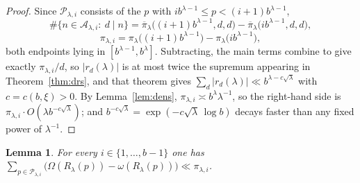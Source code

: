 \documentclass[11pt,a4paper]{article}
\theoremstyle{plain}
\newtheorem{lemma}[theorem]{Lemma}
\theoremstyle{definition}
\numberwithin{equation}{section}
\begin{document}
\begin{proof}
Since $\mathcal P_{\lambda,i}$
consists of the $p$ with $ib^{\lambda-1}\le p<(i+1)b^{\lambda-1}$,
\[
\#\bigl\{n\in\mathcal A_{\lambda,i}:\ d\mid n\bigr\}
=\overline\pi_\lambda\bigl((i+1)b^{\lambda-1},d,d\bigr)-\overline\pi_\lambda\bigl(ib^{\lambda-1},d,d\bigr),
\]
\[ \pi_{\lambda,i}=\pi_\lambda\bigl((i+1)b^{\lambda-1}\bigr)-\pi_\lambda\bigl(ib^{\lambda-1}\bigr),
\]
both endpoints lying in $[b^{\lambda-1},b^{\lambda}]$. Subtracting, the main terms combine to give exactly
$\pi_{\lambda,i}/d$, so $|r_d(\lambda)|$ is at most twice the supremum appearing in
Theorem~\ref{thm:drs}, and that theorem gives $\sum_{d}|r_d(\lambda)|\ll b^{\lambda-c\sqrt\lambda}$ with
$c=c(b,\xi)>0$. By Lemma~\ref{lem:dens}, $\pi_{\lambda,i}\asymp b^{\lambda}\lambda^{-1}$, so the
right-hand side is $\pi_{\lambda,i}\cdot O(\lambda b^{-c\sqrt\lambda})$; and
$b^{-c\sqrt\lambda}=\exp(-c\sqrt\lambda\,\log b)$ decays faster than any fixed
power of $\lambda^{-1}$.
\end{proof}

\begin{lemma}\label{lem:hyp3}
For every $i\in\{1,\dots,b-1\}$ one has
$\sum_{p\in\mathcal P_{\lambda,i}}\bigl(\Omega(R_\lambda(p))-\omega(R_\lambda(p))\bigr)\ll\pi_{\lambda,i}$.
\end{lemma}
\end{document}
